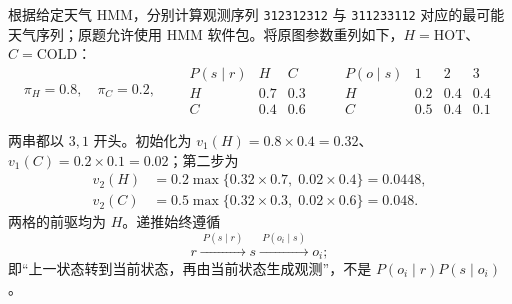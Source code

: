 根据给定天气 HMM，分别计算观测序列 \texttt{312312312} 与 \texttt{311233112} 对应的最可能天气序列；原题允许使用 HMM 软件包。将原图参数重列如下，$H=\mathrm{HOT}$、$C=\mathrm{COLD}$：
\[
\pi_H=0.8,\quad\pi_C=0.2,\qquad
\begin{array}{c|cc}
P(s\mid r)&H&C\\\hline
H&0.7&0.3\\
C&0.4&0.6
\end{array}
\qquad
\begin{array}{c|ccc}
P(o\mid s)&1&2&3\\\hline
H&0.2&0.4&0.4\\
C&0.5&0.4&0.1
\end{array}
\]

\begin{checkedsolution}
\nopagebreak[4]
两串都以 $3,1$ 开头。初始化为 $v_1(H)=0.8\times0.4=0.32$、$v_1(C)=0.2\times0.1=0.02$；第二步为
\begin{align*}
v_2(H)&=0.2\max\{0.32\times0.7,\;0.02\times0.4\}=0.0448,\\
v_2(C)&=0.5\max\{0.32\times0.3,\;0.02\times0.6\}=0.048.
\end{align*}
两格的前驱均为 $H$。递推始终遵循
\[
r\xrightarrow{\ P(s\mid r)\ }s\xrightarrow{\ P(o_i\mid s)\ }o_i;
\]
即“上一状态转到当前状态，再由当前状态生成观测”，不是 $P(o_i\mid r)P(s\mid o_i)$。


\end{checkedsolution}
